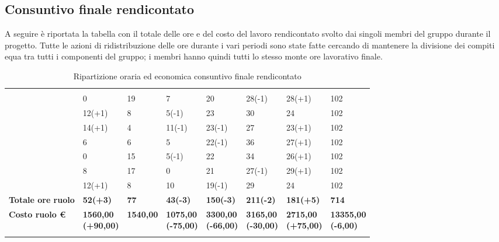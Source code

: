 \subsection{Consuntivo finale rendicontato}
A seguire è riportata la tabella con il totale delle ore e del costo del lavoro rendicontato svolto dai singoli membri del gruppo durante il progetto. Tutte le azioni di ridistribuzione delle ore durante i vari periodi sono state fatte cercando di mantenere la divisione dei compiti equa tra tutti i componenti del gruppo; i membri hanno quindi tutti lo stesso monte ore lavorativo finale.
{
\setlength\arrayrulewidth{1pt}
\begin{longtable}{| C{2cm} | C{1.7cm} | C{1.5cm} | C{1.7cm} | C{1.5cm} | C{1.5cm} | C{1.7cm} | C{2cm}|} 
   	 &
   	 &
   	 & 
   	 &
   	 &
   	 & 
   	 &
   	 \\
   	
   	\BM{} & 0 & 19 & 7 & 20 & 28(-1) & 28(+1) & 102\\
   	\PA{} & 12(+1) & 8 & 5(-1) & 23 & 30 & 24 & 102\\
   	\RA{} & 14(+1) & 4 & 11(-1) & 23(-1) & 27 & 23(+1) & 102\\
   	\SH{} & 6 & 6 & 5 & 22(-1) & 36 & 27(+1) & 102\\
   	\SG{} & 0 & 15 & 5(-1) & 22 & 34 & 26(+1) & 102\\
   	\SP{} & 8 & 17 & 0 & 21 & 27(-1) & 29(+1) & 102\\
   	\ZM{} & 12(+1) & 8 & 10 & 19(-1) & 29 & 24 & 102\\
   
   
   	\color{white}
   	\textbf{Totale ore ruolo} &
   	\color{white}\textbf{52(+3)} & 
   	\color{white}\textbf{77} &
   	\color{white}\textbf{43(-3)} & 
   	\color{white}\textbf{150(-3)} & 
   	\color{white}\textbf{211(-2)} & 
   	\color{white}\textbf{181(+5)} & 
   	\color{white}\textbf{714}\\   
   	
   	\hline
   	
   	\color{white}
   	\textbf{Costo ruolo €} &
   	\color{white}\textbf{1560,00\newline(+90,00)} & 
   	\color{white}\textbf{1540,00} &
   	\color{white}\textbf{1075,00\newline(-75,00)} & 
   	\color{white}\textbf{3300,00\newline(-66,00)} & 
   	\color{white}\textbf{3165,00\newline(-30,00)} & 
   	\color{white}\textbf{2715,00\newline(+75,00)} & 
   	\color{white}\textbf{13355,00\newline(-6,00)}\\   
   	 
   \caption{Ripartizione oraria ed economica consuntivo finale rendicontato}
\end{longtable}
}

